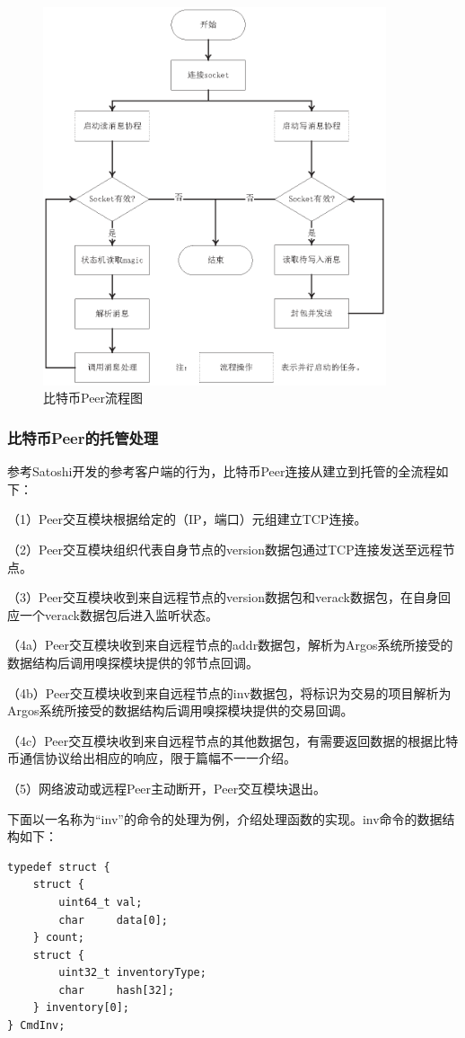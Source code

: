 \documentclass[supercite]{HustGraduPaper}
\newcommand{\xfig}[3]{
  \begin{figure}[htb]
    \centering
    #3
    \caption{#2}
    \label{fig:#1}
  \end{figure}
}
\theoremstyle{definition}
\begin{document}
\xfig{impl:peer}{比特币Peer流程图}{
  \includegraphics[width=0.9\textwidth]{images/4.1-peer.ps}
}

\subsubsection{比特币Peer的托管处理}
参考Satoshi开发的参考客户端的行为，比特币Peer连接从建立到托管的全流程如下：

（1）Peer交互模块根据给定的（IP，端口）元组建立TCP连接。

（2）Peer交互模块组织代表自身节点的version数据包通过TCP连接发送至远程节点。

（3）Peer交互模块收到来自远程节点的version数据包和verack数据包，在自身回应一个verack数据包后进入监听状态。

（4a）Peer交互模块收到来自远程节点的addr数据包，解析为Argos系统所接受的数据结构后调用嗅探模块提供的邻节点回调。

（4b）Peer交互模块收到来自远程节点的inv数据包，将标识为交易的项目解析为Argos系统所接受的数据结构后调用嗅探模块提供的交易回调。

（4c）Peer交互模块收到来自远程节点的其他数据包，有需要返回数据的根据比特币通信协议给出相应的响应，限于篇幅不一一介绍。

（5）网络波动或远程Peer主动断开，Peer交互模块退出。

下面以一名称为“inv”的命令的处理为例，介绍处理函数的实现。inv命令的数据结构如下：
\begin{verbatim}
typedef struct {
    struct {
        uint64_t val;
        char     data[0];
    } count;
    struct {
        uint32_t inventoryType;
        char     hash[32];
    } inventory[0];
} CmdInv;
\end{verbatim}
\end{document}
